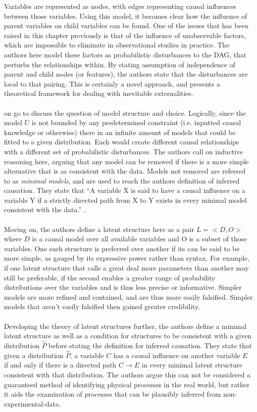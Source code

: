 {{Variables are represented as nodes, with edges representing causal influences between those variables. Using this model, it becomes clear how the influence of parent variables on child variables can be found. One of the issues that has been raised in this chapter previously is that of the influence of unobservable factors, which are impossible to eliminate in observational studies in practice. The authors here model these factors as probabilistic disturbances to the DAG, that perturbs the relationships within. By stating assumption of independence of parent and child nodes (or features), the authors state that the disturbances are local to that pairing. This is certainly a novel approach, and presents a theoretical framework for dealing with inevitable externalities.\\\\
\cite {pearl1995theory} on go to discuss the question of model structure and choice. Logically, since the model $U$ is not bounded by any predetermined constraint (i.e. inputted causal knowledge or otherwise) there in an infinite amount of models that could be fitted to a given distribution. Each would create different causal relationships with a different set of probabilistic disturbances. The authors call on inductive reasoning here, arguing that any model can be removed if there is a more simple alternative that is as consistent with the data. Models not removed are referred to as {\it minimal models}, and are used to reach the authors definition of inferred causation. They state that
``A variable X is said to have a causal influence on a variable Y if a strictly directed path from X to Y exists in every minimal model consistent with the data.''   \cite {pearl1995theory}. \\\\
Moving on, the authors define a latent structure here as a pair $L = <D,O>$ where $D$ is a causal model over all available variables and O is a subset of those variables. One such structure is preferred over another if its can be said to be more simple, as gauged by its expressive power rather than syntax. For example, if one latent structure that calls a great deal more parameters than another may still be preferable, if the second enables a greater range of probability distributions over the variables and is thus less precise or informative. Simpler models are more refined and contained, and are thus more easily falsified. Simpler models that aren't easily falsified then gained greater credibility. \\\\
Developing the theory of latent structures further, the authors define a minimal latent structure as well as a condition for structures to be consistent with a given distribution $\hat{P}$ before stating the definition for inferred causation. They state that given a distribution $\hat{P}$, a variable $C$ has a causal influence on another variable $E$ if and only if there is a directed path $C \rightarrow E$ in every minimal latent structure consistent with that distribution. The authors argue this can not be considered a guaranteed method of identifying physical processes in the real world, but rather it aids the examination of processes that can be plausibly inferred from non-experimental-data.
}}
